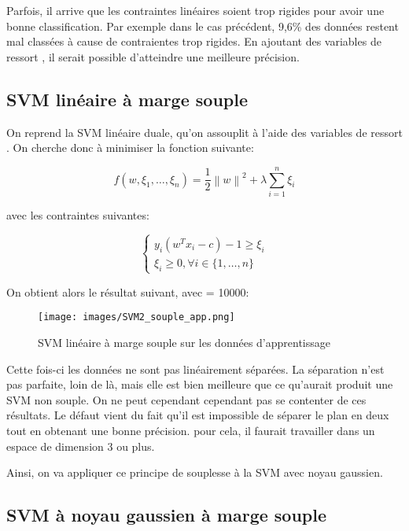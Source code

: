 \documentclass{article}
\begin{document}
Parfois, il arrive que les contraintes linéaires soient trop rigides pour avoir une bonne classification. Par exemple dans le cas précédent, 9,6\% des données restent mal classées à cause de contraientes trop rigides.
En ajoutant des variables de ressort \lambda, il serait possible d'atteindre une meilleure précision.

\subsection{SVM linéaire à marge souple}

On reprend la SVM linéaire duale, qu'on assouplit à l'aide des variables de ressort \lambda. On cherche donc à minimiser la fonction suivante:

\begin{equation}
    f(w, \xi_1, \ldots, \xi_n) = \frac{1}{2} \left\| w \right\|^2 + \lambda \sum_{i=1}^n \xi_i
\end{equation}

avec les contraintes suivantes:

\begin{equation}
    \left\{
    \begin{array}{l}
        y_i (w^T x_i - c) - 1 \geq \xi_i \\
        \xi_i \geq 0,  \forall i \in \{1,\ldots,n\}
    \end{array}
    \right.
\end{equation}

On obtient alors le résultat suivant, avec \lambda = 10000:

\begin{figure}[H]
    \centering
    \texttt{[image: images/SVM2\_souple\_app.png]}
    \caption{SVM linéaire à marge souple sur les données d'apprentissage}
\end{figure}

Cette fois-ci les données ne sont pas linéairement séparées. La séparation n'est pas parfaite, loin de là, mais elle est bien meilleure que ce qu'aurait produit une SVM non souple. On ne peut cependant cependant pas se contenter de ces résultats.
Le défaut vient du fait qu'il est impossible de séparer le plan en deux tout en obtenant une bonne précision. pour cela, il faurait travailler dans un espace de dimension 3 ou plus.

Ainsi, on va appliquer ce principe de souplesse à la SVM avec noyau gaussien.

\subsection{SVM à noyau gaussien à marge souple}
\end{document}
